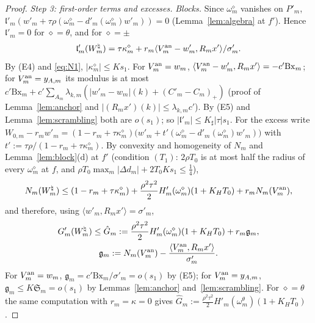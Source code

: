 \documentclass[10pt]{amsart}
\theoremstyle{definition}
\theoremstyle{remark}
\newcommand{\ip}[2]{\langle #1,#2\rangle}
\newcommand{\lin}{\mathfrak l}
\begin{document}
\begin{proof}
\emph{Step 3: first-order terms and excesses.}
\emph{Blocks.}  Since $\omega^\diamond_m$ vanishes on $P'_m$,
$\lin'_m(w'_m+\tau\rho(\omega^\diamond_m-d'_m(\omega^\diamond_m)w'_m))=0$
(Lemma~\ref{lem:algebra} at $f'$).  Hence $\lin'_m=0$ for $\diamond=\theta$, and
for $\diamond=\pm$
\[
 \lin'_m(W^\natural_m)=\tau\kappa^\diamond_m+r_m\ip{V^{\rm an}_m-w'_m}{R_mx'}/\sigma'_m .
\]
By (E4) and \eqref{eq:N1}, $|\kappa^\diamond_m|\le Ks_1$.  For $V^{\rm an}_m=w_m$,
$\ip{V^{\rm an}_m-w'_m}{R_mx'}=-c'\mathrm{Bx}_m$; for $V^{\rm an}_m=y_{A,m}$ its modulus is at
most $c'\mathrm{Bx}_m+c'\sum_{A_m}\lambda_{k,m}(|w'_m-w_m|(k)+(C'_m-C_m)_+)$
(proof of Lemma~\ref{lem:anchor} and $|(R_mx')(k)|\le\lambda_{k,m}c'$).  By
(E5) and Lemma~\ref{lem:scrambling} both are $o(s_1)$; so
$|\lin'_m|\le K_{\sharp}|\tau|s_1$.  For the excess write
$W_{0,m}-r_mw'_m=(1-r_m+\tau\kappa^\diamond_m)\big(w'_m+t'
(\omega^\diamond_m-d'_m(\omega^\diamond_m)w'_m)\big)$ with
$t':=\tau\rho/(1-r_m+\tau\kappa^\diamond_m)$.  By convexity and homogeneity of
$N_m$ and Lemma~\ref{lem:block}(d) at $f'$ (condition $(T_1)$: $2\rho T_0$ is
at most half the radius of every $\omega^\diamond_m$ at $f$, and
$\rho T_0\max_m|\Delta d_m|+2T_0Ks_1\le\frac14$),
\[
 N_m(W^\natural_m)\le(1-r_m+\tau\kappa^\diamond_m)+\frac{\rho^2\tau^2}2
 H'_m(\omega^\diamond_m)(1+K_HT_0)+r_mN_m(V^{\rm an}_m),
\]
and therefore, using $\ip{w'_m}{R_mx'}=\sigma'_m$,
\begin{gather*}
 G'_m(W^\natural_m)\le\hat G_m:=\frac{\rho^2\tau^2}2H'_m(\omega^\diamond_m)
 (1+K_HT_0)+r_m\mathfrak g_m,\\
 \mathfrak g_m:=N_m(V^{\rm an}_m)-\frac{\ip{V^{\rm an}_m}{R_mx'}}{\sigma'_m}.
\end{gather*}
For $V^{\rm an}_m=w_m$, $\mathfrak g_m=c'\mathrm{Bx}_m/\sigma'_m=o(s_1)$ by (E5);
for $V^{\rm an}_m=y_{A,m}$, $\mathfrak g_m\le K\mathfrak S_m=o(s_1)$ by
Lemmas~\ref{lem:anchor} and~\ref{lem:scrambling}.  For $\diamond=\theta$ the
same computation with $r_m=\kappa=0$ gives $\hat G_m:=\frac{\rho^2\tau^2}2
H'_m(\omega^\theta_m)(1+K_HT_0)$.


\end{proof}
\end{document}
